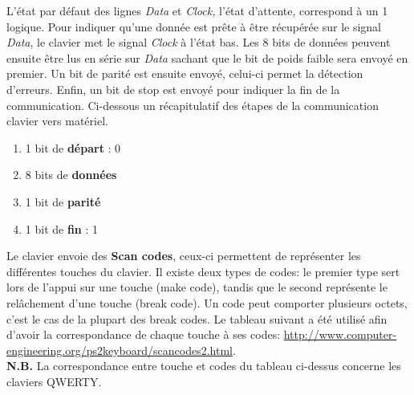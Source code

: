 L'état par défaut des lignes \emph{Data} et \emph{Clock,} l'état d'attente, correspond à un 1 logique. Pour indiquer qu'une donnée est prête à être récupérée sur le signal \emph{Data}, le clavier met le signal \emph{Clock} à l'état bas. Les 8 bits de données peuvent ensuite être lus en série sur \emph{Data} sachant que le bit de poids faible sera envoyé en premier. Un bit de parité est ensuite envoyé, celui-ci permet la détection d'erreurs. Enfin, un bit de stop est envoyé pour indiquer la fin de la communication. Ci-dessous un récapitulatif des étapes de la communication clavier vers matériel.

\begin{enumerate}
\item 1 bit de \textbf{départ} : 0
\item 8 bits de \textbf{données}
\item 1 bit de \textbf{parité}
\item 1 bit de \textbf{fin} : 1\\
\end{enumerate}


Le clavier envoie des \textbf{Scan codes}, ceux-ci permettent de représenter les différentes touches du clavier. Il existe deux types de codes: le premier type sert lors de l'appui sur une touche (make code), tandis que le second représente le relâchement d'une touche (break code). Un code peut comporter plusieurs octets, c'est le cas de la plupart des break codes. Le tableau suivant a été utilisé afin d'avoir la correspondance de chaque touche à ses codes: \href{http://www.computer-engineering.org/ps2keyboard/scancodes2.html}{http://www.computer-engineering.org/ps2keyboard/scancodes2.html}.\\
\textbf{N.B.} La correspondance entre touche et codes du tableau ci-dessus concerne les claviers QWERTY.\\

\newpage

